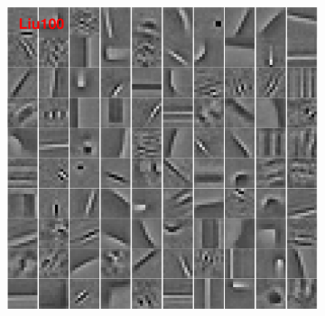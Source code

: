 \begin{figure}[h]
\begin{minipage}{0.4\textwidth}
\begin{subfigure}{1\textwidth}
    \centering
  \includegraphics[width=0.75\linewidth]{figure/liu100-filter.pdf}
  \vspace*{2mm}
\end{subfigure}


\end{minipage}
\end{figure}

